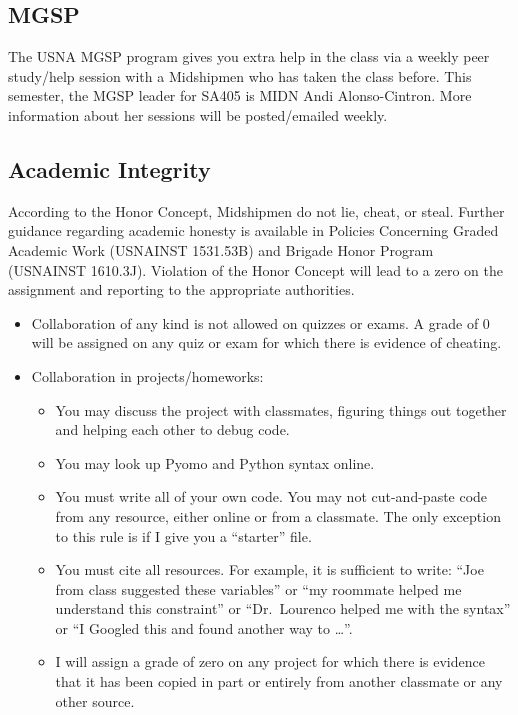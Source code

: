 \documentclass[letterpaper,hidelinks,oneside,11pt]{article}%
\begin{document}
\subsection*{MGSP}

The USNA MGSP program gives you extra help in the class via a weekly peer study/help session with a Midshipmen who has taken the class before. This semester, the MGSP leader for SA405 is MIDN Andi Alonso-Cintron. More information about her sessions will be posted/emailed weekly.

\subsection*{Academic Integrity}

According to the Honor Concept, Midshipmen do not lie, cheat, or steal. Further guidance regarding academic honesty is available in Policies Concerning Graded Academic Work (USNAINST 1531.53B) and Brigade Honor Program (USNAINST 1610.3J). Violation of the Honor Concept will lead to a zero on the assignment and reporting to the appropriate authorities. 
\begin{itemize}
	\item Collaboration of any kind is not allowed on quizzes or exams. A grade of 0 will be assigned on any quiz or exam for which there is evidence of cheating.
	\item Collaboration in projects/homeworks:
	\begin{itemize}
	\item You may discuss the project with classmates, figuring things out together and helping each other to debug code.
	\item You may look up Pyomo and Python syntax online.
	\item You must write all of your own code. You may not cut-and-paste code from any resource, either online or from a classmate. The only exception to this rule is if I give you a ``starter'' file.
	\item You must cite all resources. For example, it is sufficient to write: “Joe from class suggested these variables” or “my roommate helped me understand this constraint” or “Dr.\ Lourenco helped me with the syntax” or “I Googled this and found another way to …”.
	\item I will assign a grade of zero on any project for which there is evidence that it has been copied in part or entirely from another classmate or any other source.
	\end{itemize}
\end{itemize}
\end{document}
